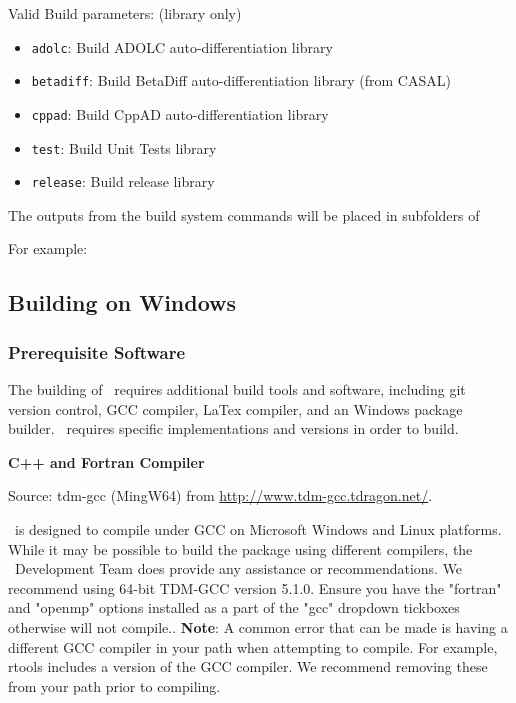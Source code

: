 Valid Build parameters: (library only)
\begin{itemize}
  \item \texttt{adolc}: Build ADOLC auto-differentiation library
  \item \texttt{betadiff}: Build BetaDiff auto-differentiation library (from CASAL)
  \item \texttt{cppad}: Build CppAD auto-differentiation library
  \item \texttt{test}: Build Unit Tests library
  \item \texttt{release}: Build release library
\end{itemize}

The outputs from the build system commands will be placed in subfolders of 

For example:





\subsection{Building on Windows}

\subsubsection{Prerequisite Software}

The building of \CNAME\ requires additional build tools and software, including git version control, GCC compiler, LaTex compiler, and an Windows package builder. \CNAME\ requires specific implementations and versions in order to build. 

\textbf{C++ and Fortran Compiler}

Source: tdm-gcc (MingW64) from \url{http://www.tdm-gcc.tdragon.net/}.

\CNAME\ is designed to compile under GCC on Microsoft Windows and Linux  platforms. While it may be possible to build the package using different compilers, the \CNAME\ Development Team does provide any assistance or recommendations. We recommend using 64-bit TDM-GCC version 5.1.0. Ensure you have the "fortran" and "openmp" options installed as a part of the "gcc" dropdown tickboxes otherwise \CNAME will not compile.. \textbf{Note}: A common error that can be made is having a different GCC compiler in your path when attempting to compile. For example, rtools includes a version of the GCC compiler. We recommend removing these from your path prior to compiling.


